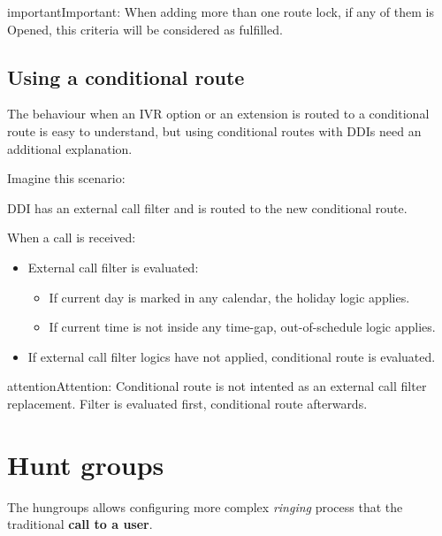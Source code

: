 \documentclass[letterpaper,10pt,english]{sphinxmanual}
\begin{document}
\begin{notice}{important}{Important:}
When adding more than one route lock, if any of them is Opened, this criteria will be considered as fulfilled.
\end{notice}


\subsection{Using a conditional route}
\label{pbx_features/conditional_routes:using-a-conditional-route}
The behaviour when an IVR option or an extension is routed to a conditional
route is easy to understand, but using conditional routes with DDIs need an
additional explanation.

Imagine this scenario:

\noindent{}

DDI has an external call filter and is routed to the new conditional route.

When a call is received:
\begin{itemize}
\item {} 
External call filter is evaluated:
\begin{itemize}
\item {} 
If current day is marked in any calendar, the holiday logic applies.

\item {} 
If current time is not inside any time-gap, out-of-schedule logic applies.

\end{itemize}

\item {} 
If external call filter logics have not applied, conditional route is evaluated.

\end{itemize}

\begin{notice}{attention}{Attention:}
Conditional route is not intented as an external call filter
replacement. Filter is evaluated first, conditional route afterwards.
\end{notice}


\section{Hunt groups}
\label{pbx_features/huntgroups:hunt-groups}\label{pbx_features/huntgroups::doc}\label{pbx_features/huntgroups:huntgroups}
The hungroups allows configuring more complex \emph{ringing} process that the
traditional \textbf{call to a user}.
\end{document}
